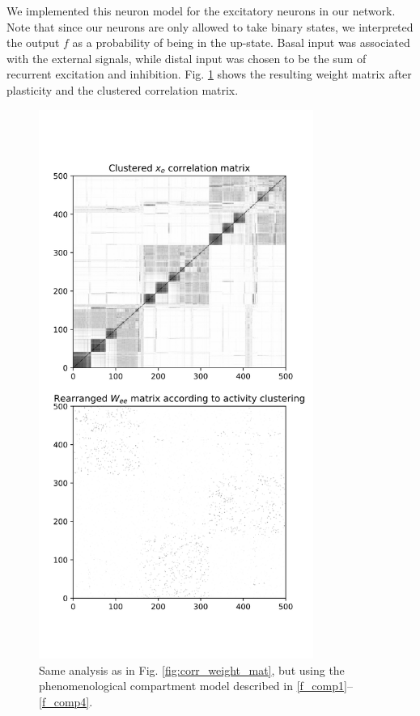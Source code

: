 \documentclass[10pt,a4paper]{article}
\begin{document}
We implemented this neuron model for the excitatory neurons in our network. Note that since our neurons are only allowed to take binary states, we interpreted the output $f$ as a probability of being in the up-state. Basal input was associated with the external signals, while distal input was chosen to be the sum of recurrent excitation and inhibition. Fig. \ref{fig:corr_weight_mat_prox_dist} shows the resulting weight matrix after plasticity and the clustered correlation matrix.

\begin{figure}
\includegraphics[width=0.8\textwidth]{../plots/corr_weight_mat_prox_dist.png}
\caption{\label{fig:corr_weight_mat_prox_dist} Same analysis as in Fig. \ref{fig:corr_weight_mat}, but using the phenomenological compartment model described in \eqref{f_comp1}--\eqref{f_comp4}.}
\end{figure}
\end{document}
